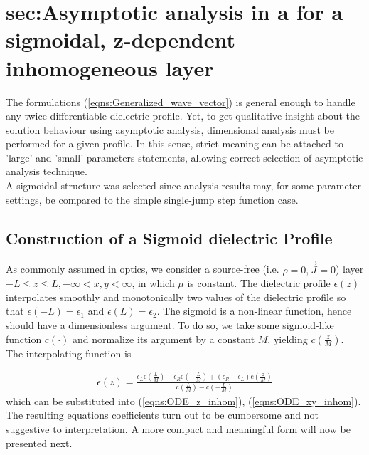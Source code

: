 \documentclass[twocolumn,secnumarabic,amssymb, nobibnotes, aps, prd]{revtex4-1}
\begin{document}
   
  


\section{sec:Asymptotic analysis in a for a sigmoidal, z-dependent inhomogeneous layer} 
The formulations (\ref{eqns:Generalized_wave_vector}) is general enough to handle any twice-differentiable dielectric profile. Yet,  to get qualitative insight about the solution behaviour using asymptotic analysis, dimensional analysis must be performed for a given profile. In this sense, strict meaning can be attached to 'large' and 'small' parameters statements, allowing correct selection of asymptotic analysis technique.  \\
A sigmoidal structure was selected since analysis results may, for some parameter settings, be compared to the simple single-jump step function case. 
\subsection{Construction of a Sigmoid dielectric Profile}
\label{sec:sigmoid_profile}
As commonly assumed in optics, we consider a source-free (i.e. $\rho=0, \overrightarrow{J}=0$) layer $-L \leq z \leq L, -\infty < x,y < \infty$, in  which $\mu$ is constant. The dielectric profile $\epsilon(z)$ interpolates smoothly and monotonically two values of the dielectric profile so that $\epsilon(-L)=\epsilon_1$ and $\epsilon(L)=\epsilon_2$. The sigmoid is a non-linear function, hence should have a dimensionless argument. To do so, we take some sigmoid-like function $c( \cdot )$ and normalize its argument  by  a constant $M$, yielding $c\left( \frac{z}{M}\right)$. The interpolating function is


\begin{align}
\epsilon(z) = \frac{\epsilon_L \text{c}\left(\frac{L}{M}\right)-\epsilon_R \text{c}\left(-\frac{L}{M}\right)+(\epsilon_R-\epsilon_L)
   \text{c}\left(\frac{z}{M}\right)}{\text{c}\left(\frac{L}{M}\right)-\text{c}\left(-\frac{L}{M}\right)
   }
\label{eqns:eps_z_dim_profile}
\end{align}
which can be substituted into (\ref{eqns:ODE_z_inhom}), (\ref{eqns:ODE_xy_inhom}). The resulting equations coefficients turn out to be cumbersome and not suggestive to interpretation. A more compact and meaningful form will now be presented next.

  
\end{document}
